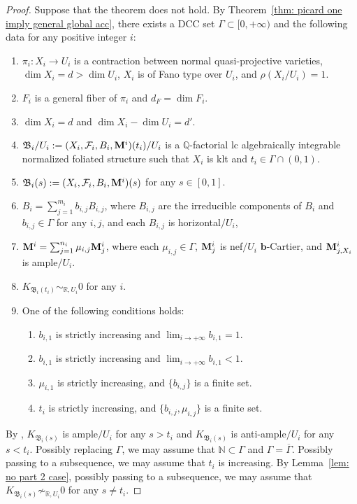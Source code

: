 \documentclass[11pt,reqno]{amsart}
\numberwithin{equation}{section}
\newcommand{\bb}{\bm{b}}
\newcommand{\Mm}{{\bf{M}}}
\newcommand{\Bb}{{\mathfrak{B}}}
\newcommand{\Ff}{\mathcal{F}}
\newcommand{\Ii}{\Gamma}
\theoremstyle{definition}
\begin{document}
\begin{proof}
Suppose that the theorem does not hold. By Theorem~\ref{thm: picard one imply general global acc}, there exists a DCC set $\Ii\subset [0,+\infty)$ and the following data for any positive integer $i$:
\begin{enumerate}
\item $\pi_i: X_i\rightarrow U_i$ is a contraction between normal quasi-projective varieties, $\dim X_i=d>\dim U_i$, $X_i$ is of Fano type over $U_i$, and $\rho(X_i/U_i)=1$. 
\item $F_i$ is a general fiber of $\pi_i$ and $d_F=\dim F_i$.
\item $\dim X_i=d$ and $\dim X_i-\dim U_i=d'$.
\item $\Bb_i/U_i:=(X_i,\Ff_i,B_i,\Mm^i)(t_i)/U_i$ is a $\mathbb Q$-factorial lc algebraically integrable normalized foliated structure such that $X_i$ is klt and $t_i\in\Ii\cap (0,1)$.
\item $\Bb_i(s):=(X_i,\Ff_i,B_i,\Mm^i)(s)$ for any $s\in [0,1]$.
\item $B_i=\sum_{j=1}^{m_i}b_{i,j}B_{i,j}$, where $B_{i,j}$ are the irreducible components of $B_i$ and $b_{i,j}\in\Ii$ for any $i,j$, and each $B_{i,j}$ is horizontal$/U_i$,
\item $\Mm^i=\sum_{j=1}^{n_i}\mu_{i,j}\Mm^i_j$, where each $\mu_{i,j}\in\Ii$, $\Mm^i_j$ is nef$/U_i$ $\bb$-Cartier, and $\Mm^i_{j,X_i}$ is ample$/U_i$.
\item $K_{\Bb_i(t_i)}\sim_{\mathbb R,U_i}0$ for any $i$.
\item One of the following conditions holds:
    \begin{enumerate}
        \item $b_{i,1}$ is strictly increasing and $\lim_{i\rightarrow+\infty}b_{i,1}=1$.
        \item $b_{i,1}$ is strictly increasing and $\lim_{i\rightarrow+\infty}b_{i,1}<1$.
        \item $\mu_{i,1}$ is strictly increasing, and $\{b_{i,j}\}$ is a finite set.
        \item $t_i$ is strictly increasing, and $\{b_{i,j},\mu_{i,j}\}$ is a finite set.
    \end{enumerate}
\end{enumerate}
By \cite[Theorem~5.1]{Cas+25a}, $K_{\Bb_i(s)}$ is ample$/U_i$ for any $s>t_i$ and $K_{\Bb_i(s)}$ is anti-ample$/U_i$ for any $s<t_i$. Possibly replacing $\Ii$, we may assume that $\mathbb N\subset\Ii$ and $\Ii=\overline{\Ii}$. Possibly passing to a subsequence, we may assume that $t_i$ is increasing. By Lemma~\ref{lem: no part 2 case}, possibly passing to a subsequence, we may assume that $K_{\Bb_i(s)}\not\sim_{\mathbb R,U_i}0$ for any $s\neq t_i$.


\end{proof}
\end{document}
